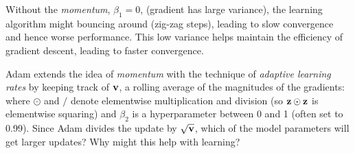 \begin{parts}
\begin{subparts}
{	        Without the \emph{momentum}, $\beta_1=0$, (gradient has large variance), the learning algorithm might bouncing around (zig-zag steps), leading to slow convergence and hence worse performance.     This low variance helps maintain the efficiency of gradient descent, leading to faster convergence.
            }\newline
                
            \subpart[2] Adam extends the idea of {\it momentum} with the technique of {\it adaptive learning rates} by keeping track of  $\mathbf{v}$, a rolling average of the magnitudes of the gradients:
            where $\odot$ and $/$ denote elementwise multiplication and division (so $\mathbf{z} \odot \mathbf{z}$ is elementwise squaring) and $\beta_2$ is a hyperparameter between 0 and 1 (often set to  0.99). Since Adam divides the update by $\sqrt{\mathbf{v}}$, which of the model parameters will get larger updates?  Why might this help with learning?
            
            \newline
                
        \end{subparts}
        
        

\end{parts}
